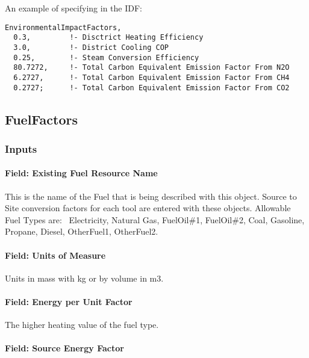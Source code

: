 An example of specifying in the IDF:

\begin{lstlisting}
EnvironmentalImpactFactors,
  0.3,         !- Disctrict Heating Efficiency
  3.0,         !- District Cooling COP
  0.25,        !- Steam Conversion Efficiency
  80.7272,     !- Total Carbon Equivalent Emission Factor From N2O
  6.2727,      !- Total Carbon Equivalent Emission Factor From CH4
  0.2727;      !- Total Carbon Equivalent Emission Factor From CO2
\end{lstlisting}

\subsection{FuelFactors}\label{fuelfactors}

\subsubsection{Inputs}\label{inputs-11-015}

\paragraph{Field: Existing Fuel Resource Name}\label{field-existing-fuel-resource-name}

This is the name of the Fuel that is being described with this object. Source to Site conversion factors for each tool are entered with these objects. Allowable Fuel Types are:~ Electricity, Natural Gas, FuelOil\#1, FuelOil\#2, Coal, Gasoline, Propane, Diesel, OtherFuel1, OtherFuel2.

\paragraph{Field: Units of Measure}\label{field-units-of-measure}

Units in mass with kg or by volume in m3.

\paragraph{Field: Energy per Unit Factor}\label{field-energy-per-unit-factor}

The higher heating value of the fuel type.

\paragraph{Field: Source Energy Factor}\label{field-source-energy-factor}

